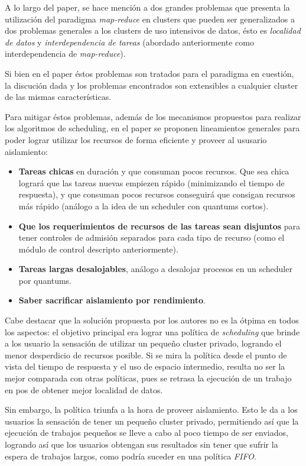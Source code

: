 \documentclass[a4paper]{article}
\begin{document}
A lo largo del paper, se hace mención a dos grandes problemas que presenta la
utilización del paradigma \textit{map-reduce} en clusters que pueden ser
generalizados a dos problemas generales a los clusters de uso intensivos de
datos, ésto es \textit{localidad de datos} y \textit{interdependencia de
tareas} (abordado anteriormente como interdependencia de \textit{map-reduce}).

Si bien en el paper éstos problemas son tratados para el paradigma en cuestión,
la discución dada y los problemas encontrados son extensibles a cualquier
cluster de las mismas características.

Para mitigar éstos problemas, además de los mecanismos propuestos para realizar
los algoritmos de scheduling, en el paper se proponen lineamientos generales
para poder lograr utilizar los recursos de forma eficiente y proveer al
ususario aislamiento:

\begin{itemize}
  \item \textbf{Tareas chicas} en duración y que consuman pocos recursos. Que
  sea chica logrará que las tareas nuevas empiezen rápido (minimizando el
  tiempo de respuesta), y que consuman pocos recursos conseguirá que consigan
  recursos más rápido (análogo a la idea de un scheduler con quantums cortos).
  \item \textbf{Que los requerimientos de recursos de las tareas sean
  disjuntos} para tener controles de admisión separados para cada tipo de
  recurso (como el módulo de control descripto anteriormente).
  \item \textbf{Tareas largas desalojables}, análogo a desalojar procesos en un
  scheduler por quantums.
  \item \textbf{Saber sacrificar aislamiento por rendimiento}.
\end{itemize}

Cabe destacar que la solución propuesta por los autores no es la ótpima en
todos los aspectos: el objetivo principal era lograr una política de
\textit{scheduling} que brinde a los usuario la sensación de utilizar un
pequeño cluster privado, logrando el menor desperdicio de recursos posible. Si
se mira la política desde el punto de vista del tiempo de respuesta y el uso de
espacio intermedio, resulta no ser la mejor comparada con otras políticas, pues
se retrasa la ejecución de un trabajo en pos de obtener mejor localidad de
datos.

Sin embargo, la política triunfa a la hora de proveer aislamiento. Esto le da a
los usuarios la sensación de tener un pequeño cluster privado, permitiendo así
que la ejecución de trabajos pequeños se lleve a cabo al poco tiempo de ser
enviados, logrando así que los usuarios obtengan sus resultados sin tener que
sufrir la espera de trabajos largos, como podría suceder en una política
\textit{FIFO}.
\end{document}
